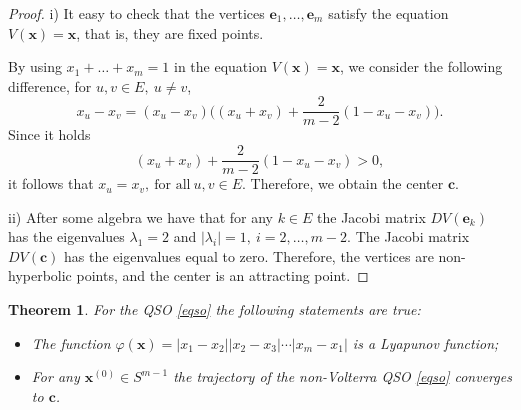 \documentclass[11pt,reqno]{amsart}
\newtheorem{theorem}[subsection]{Theorem}
\numberwithin{equation}{section} \setcounter{tocdepth}{1}
\begin{document}
\begin{proof} i) It easy to check that the  vertices $\mathbf{e}_1,\dots,\mathbf{e}_m$
satisfy the equation $V(\mathbf{x})=\mathbf{x}$, that is, they are fixed points.


By  using $x_1+\dots+x_m=1$
in the equation $V(\mathbf{x})=\mathbf{x}$, we consider the following difference, for $ u,v \in E, \ u\neq v$,
\[x_u-x_v=(x_u-x_v)\Big((x_u+x_v)+\frac{2}{m-2} (1-x_u-x_v)\Big).\]
Since it holds
\[(x_u+x_v)+\frac{2}{m-2} (1-x_u-x_v)>0,\]
it follows that $x_u=x_v, \  \text{for all} \  u,v \in E$.
Therefore, we obtain the center $\mathbf{c}$.

ii) After some algebra we have that for any $k\in E$ the Jacobi matrix $D V (\mathbf{e}_k)$ has
the eigenvalues $\lambda_1=2$ and $|\lambda_i|=1, \  i=2,\dots, m-2$.
The Jacobi matrix $D V (\mathbf{c})$ has the eigenvalues equal to zero.
Therefore,  the vertices are non-hyperbolic points, and the center is an attracting point.
\end{proof}

\begin{theorem}  For the QSO \eqref{eqso} the following statements are true:
\begin{itemize}
\item[i)] The function $\varphi(\mathbf{x}) =|x_1-x_2||x_2-x_3|\cdots |x_m-x_1|$ is a Lyapunov function;
\item[ii)] For any $\mathbf{x}^{(0)}\in S^{m-1}$ the trajectory of the non-Volterra QSO \eqref{eqso} converges to $\mathbf{c}$.
\end{itemize}
\end{theorem}
\end{document}
